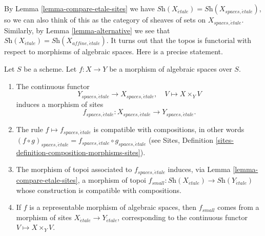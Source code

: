 \noindent
By
Lemma \ref{lemma-compare-etale-sites}
we have
$\textit{Sh}(X_{\acute{e}tale}) = \textit{Sh}(X_{spaces, \acute{e}tale})$,
so we can also think of this as the category of sheaves of sets on
$X_{spaces, \acute{e}tale}$. Similarly, by
Lemma \ref{lemma-alternative}
we see that
$\textit{Sh}(X_{\acute{e}tale}) = \textit{Sh}(X_{affine, \acute{e}tale})$.
It turns out that the topos is functorial with respect to morphisms
of algebraic spaces. Here is a precise statement.

\begin{lemma}
\label{lemma-functoriality-etale-site}
Let $S$ be a scheme.
Let $f : X \to Y$ be a morphism of algebraic spaces over $S$.
\begin{enumerate}
\item The continuous functor
$$
Y_{spaces, \acute{e}tale} \longrightarrow X_{spaces, \acute{e}tale}, \quad
V \longmapsto X \times_Y V
$$
induces a morphism of sites
$$
f_{spaces, \acute{e}tale} :
X_{spaces, \acute{e}tale}
\to
Y_{spaces, \acute{e}tale}.
$$
\item The rule $f \mapsto f_{spaces, \acute{e}tale}$ is compatible with
compositions, in other words $(f \circ g)_{spaces, \acute{e}tale}
= f_{spaces, \acute{e}tale} \circ g_{spaces, \acute{e}tale}$ (see
Sites, Definition \ref{sites-definition-composition-morphisms-sites}).
\item The morphism of topoi associated to $f_{spaces, \acute{e}tale}$
induces, via Lemma \ref{lemma-compare-etale-sites}, a morphism of topoi
$f_{small} : \textit{Sh}(X_{\acute{e}tale}) \to \textit{Sh}(Y_{\acute{e}tale})$
whose construction is compatible with compositions.
\item If $f$ is a representable morphism of algebraic spaces,
then $f_{small}$ comes from a morphism of sites
$X_{\acute{e}tale} \to Y_{\acute{e}tale}$,
corresponding to the continuous functor $V \mapsto X \times_Y V$.
\end{enumerate}
\end{lemma}


